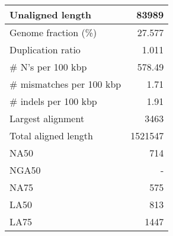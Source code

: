 \documentclass[12pt,a4paper]{article}
\begin{document}
\begin{table}[ht]
\begin{center}
\begin{tabular}{|l*{1}{|r}|}
Unaligned length & 83989 \\ \hline
Genome fraction (\%) & 27.577 \\ \hline
Duplication ratio & 1.011 \\ \hline
\# N's per 100 kbp & 578.49 \\ \hline
\# mismatches per 100 kbp & 1.71 \\ \hline
\# indels per 100 kbp & 1.91 \\ \hline
Largest alignment & 3463 \\ \hline
Total aligned length & 1521547 \\ \hline
NA50 & 714 \\ \hline
NGA50 & - \\ \hline
NA75 & 575 \\ \hline
LA50 & 813 \\ \hline
LA75 & 1447 \\ \hline
\end{tabular}
\end{center}
\end{table}
\end{document}
